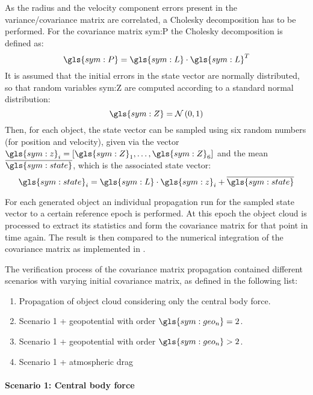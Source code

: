 As the radius and the velocity component errors present in the variance/covariance matrix are correlated, a Cholesky decomposition has to be performed. For the 
covariance matrix \gls{sym:P} the Cholesky decomposition is defined as:
\begin{equation}
 \gls{sym:P} = \gls{sym:L}\cdot\gls{sym:L}^T
\end{equation}
It is assumed that the initial errors in the state vector are normally distributed, so that random variables \gls{sym:Z} are computed according to a standard 
normal distribution:
\begin{equation}
 \gls{sym:Z} = \mathcal{N}\left(0,1\right)
\end{equation}
Then, for each object, the state vector can be sampled using six random numbers (for position and velocity), given via the vector $\gls{sym:z}_i = 
\left[\gls{sym:Z}_1,\ldots,\gls{sym:Z}_6\right]$ and the mean $\overline{\gls{sym:state}}$, which is the associated state vector:
\begin{equation}
 \gls{sym:state}_i = \gls{sym:L}\cdot\gls{sym:z}_i + \overline{\gls{sym:state}}
\end{equation}

For each generated object an individual \neptune{} propagation run for the sampled state vector to a certain reference epoch is performed. At this epoch the 
object cloud is processed to extract its statistics and form the covariance matrix for that point in time again. The result is then compared to the numerical 
integration of the covariance matrix as implemented in \neptune{}. 

The verification process of the covariance matrix propagation contained different scenarios with varying initial covariance matrix, as defined in the following 
list:
\begin{enumerate}
 \item Propagation of object cloud considering only the central body force.
 \item Scenario 1 + geopotential with order $\gls{sym:geo_n}=2$.
 \item Scenario 1 + geopotential with order $\gls{sym:geo_n}>2$.
 \item Scenario 1 + atmospheric drag
\end{enumerate}

\paragraph{Scenario 1: Central body force}

